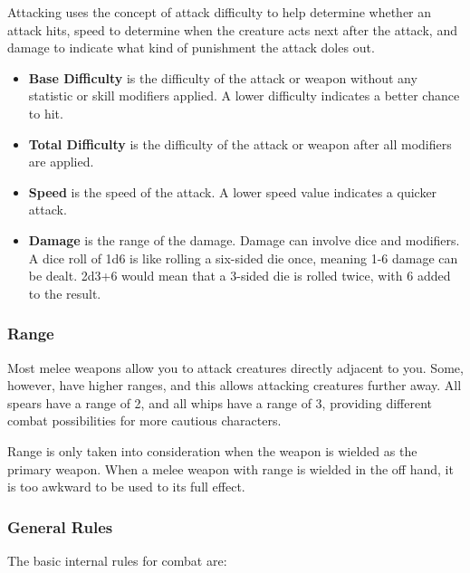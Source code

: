 Attacking uses the concept of attack difficulty to help determine whether
an attack hits, speed to determine when the creature acts next after the 
attack, and damage to indicate what kind of punishment the attack doles out.

\begin{itemize}
\item {\bf Base Difficulty} is the difficulty of the attack or weapon
without any statistic or skill modifiers applied.  A lower difficulty
indicates a better chance to hit.
\item {\bf Total Difficulty} is the difficulty of the attack or weapon
after all modifiers are applied.
\item {\bf Speed} is the speed of the attack.  A lower speed value
indicates a quicker attack.
\item {\bf Damage} is the range of the damage.  Damage can involve dice
and modifiers.  A dice roll of 1d6 is like rolling a six-sided die once,
meaning 1-6 damage can be dealt.  2d3+6 would mean that a 3-sided die
is rolled twice, with 6 added to the result.
\end{itemize}

\subsubsection{Range}

Most melee weapons allow you to attack creatures directly adjacent to you.
Some, however, have higher ranges, and this allows attacking creatures further
away.  All spears have a range of 2, and all whips have a range of 3, providing
different combat possibilities for more cautious characters.

Range is only taken into consideration when the weapon is wielded as the
primary weapon.  When a melee weapon with range is wielded in the off hand,
it is too awkward to be used to its full effect.

\subsubsection{General Rules}

The basic internal rules for combat are:

